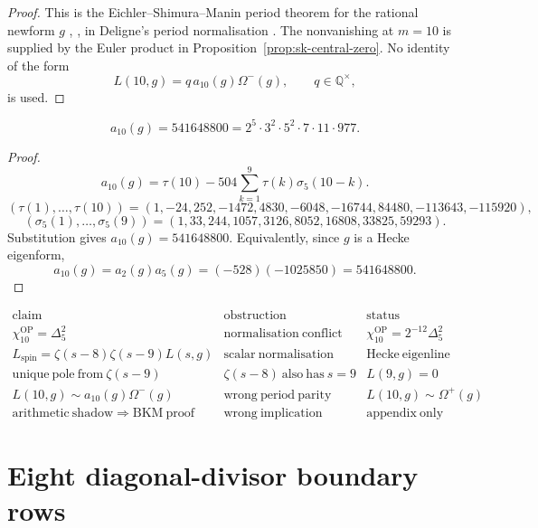 \documentclass[11pt]{memoir}
\newcommand{\Q}{\mathbb{Q}}
\begin{document}
\begin{proof}
This is the Eichler--Shimura--Manin period theorem for the rational
newform $g$ \cite{Manin72}, \cite{KZ}, in Deligne's period normalisation
\cite{Del79}.  The nonvanishing at \(m=10\) is supplied by the Euler
product in Proposition~\ref{prop:sk-central-zero}.  No identity of the form
$$L(10,g)=q\,a_{10}(g)\Omega^-(g),\qquad q\in\Q^\times,$$
is used.
\end{proof}

\begin{proposition}
\label{prop:a10-explicit}
$$a_{10}(g)=541648800
=2^5\cdot3^2\cdot5^2\cdot7\cdot11\cdot977.$$
\end{proposition}

\begin{proof}
$$a_{10}(g)=\tau(10)-504\sum_{k=1}^{9}\tau(k)\sigma_5(10-k).$$
$$
(\tau(1),\ldots,\tau(10))
=(1,-24,252,-1472,4830,-6048,-16744,84480,-113643,-115920),
$$
$$
(\sigma_5(1),\ldots,\sigma_5(9))
=(1,33,244,1057,3126,8052,16808,33825,59293).
$$
Substitution gives $a_{10}(g)=541648800$.
Equivalently, since $g$ is a Hecke eigenform,
$$a_{10}(g)=a_2(g)a_5(g)=(-528)(-1025850)=541648800.$$
\end{proof}

\begin{remark}
$$
\begin{array}{c|c|c}
\mathrm{claim}&\mathrm{obstruction}&\mathrm{status}\\ \hline
\chi_{10}^{\mathrm{OP}}=\Delta_5^2
&\mathrm{normalisation\ conflict}
&\chi_{10}^{\mathrm{OP}}=2^{-12}\Delta_5^2\\
L_{\mathrm{spin}}=\zeta(s-8)\zeta(s-9)L(s,g)
&\mathrm{scalar\ normalisation}
&\mathrm{Hecke\ eigenline}\\
\mathrm{unique\ pole\ from\ }\zeta(s-9)
&\zeta(s-8)\mathrm{\ also\ has\ }s=9
&L(9,g)=0\\
L(10,g)\sim a_{10}(g)\Omega^-(g)
&\mathrm{wrong\ period\ parity}
&L(10,g)\sim \Omega^+(g)\\
\mathrm{arithmetic\ shadow}\Rightarrow\mathrm{BKM\ proof}
&\mathrm{wrong\ implication}
&\mathrm{appendix\ only}
\end{array}
$$
\end{remark}


\section{Eight diagonal-divisor boundary rows}
\label{app:eight-row-boundary}
\end{document}
